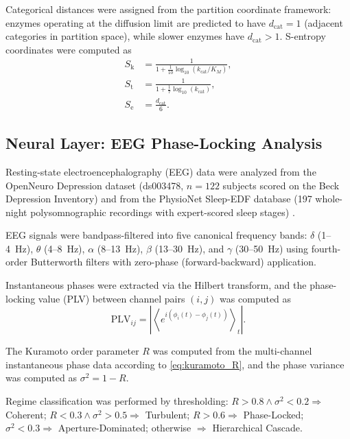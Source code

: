 \documentclass[twocolumn,10pt]{article}
\newcommand{\Sk}{S_{\mathrm{k}}}
\newcommand{\St}{S_{\mathrm{t}}}
\newcommand{\Se}{S_{\mathrm{e}}}
\newcommand{\dcat}{d_{\mathrm{cat}}}
\newcommand{\Rorder}{R}
\newcommand{\PLV}{\mathrm{PLV}}
\begin{document}
Categorical distances were assigned from the partition coordinate framework: enzymes operating at the diffusion limit are predicted to have $\dcat = 1$ (adjacent categories in partition space), while slower enzymes have $\dcat > 1$.  S-entropy coordinates were computed as
\begin{align}
  \Sk &= \frac{1}{1 + \frac{1}{10}\log_{10}(k_{\mathrm{cat}}/K_{M})}, \label{eq:sk_enzyme}\\
  \St &= \frac{1}{1 + \frac{1}{7}\log_{10}(k_{\mathrm{cat}})}, \label{eq:st_enzyme}\\
  \Se &= \frac{\dcat}{6}. \label{eq:se_enzyme}
\end{align}

\subsection{Neural Layer: EEG Phase-Locking Analysis}
\label{sec:methods_neural}

Resting-state electroencephalography (EEG) data were analyzed from the OpenNeuro Depression dataset (ds003478, $n = 122$ subjects scored on the Beck Depression Inventory) \citep{cavanagh2021eeg, markiewicz2021openneuro} and from the PhysioNet Sleep-EDF database (197 whole-night polysomnographic recordings with expert-scored sleep stages) \citep{goldberger2000physiobank, kemp2000analysis}.

EEG signals were bandpass-filtered into five canonical frequency bands: $\delta$ (1--4~Hz), $\theta$ (4--8~Hz), $\alpha$ (8--13~Hz), $\beta$ (13--30~Hz), and $\gamma$ (30--50~Hz) using fourth-order Butterworth filters with zero-phase (forward-backward) application.

Instantaneous phases were extracted via the Hilbert transform, and the phase-locking value (PLV) between channel pairs $(i, j)$ was computed as \citep{lachaux1999measuring}
\begin{equation}
  \PLV_{ij} = \left|\left\langle e^{i(\phi_{i}(t) - \phi_{j}(t))}\right\rangle_{t}\right|.
  \label{eq:plv}
\end{equation}

The Kuramoto order parameter $\Rorder$ was computed from the multi-channel instantaneous phase data according to \eqref{eq:kuramoto_R}, and the phase variance was computed as $\sigma^{2} = 1 - \Rorder$.

Regime classification was performed by thresholding: $\Rorder > 0.8 \wedge \sigma^{2} < 0.2 \Rightarrow$ Coherent; $\Rorder < 0.3 \wedge \sigma^{2} > 0.5 \Rightarrow$ Turbulent; $\Rorder > 0.6 \Rightarrow$ Phase-Locked; $\sigma^{2} < 0.3 \Rightarrow$ Aperture-Dominated; otherwise $\Rightarrow$ Hierarchical Cascade.
\end{document}
